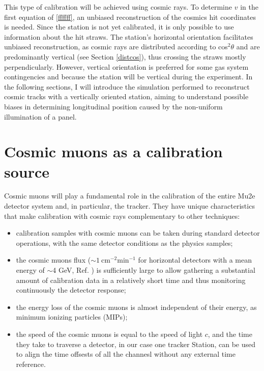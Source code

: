This type of calibration will be achieved using cosmic rays. 
To determine $v$ in the first equation of \ref{ffffff}, 
an unbiased reconstruction of the cosmics hit coordinates is needed.
Since the station is not yet calibrated, it is only possible 
to use information about the hit straws. 
The station's horizontal orientation facilitates unbiased 
reconstruction, as cosmic rays are distributed according to 
cos$^2\theta$ and are predominantly vertical (see Section \ref{distcos}), thus crossing the straws mostly perpendicularly.
However, vertical orientation is preferred for some gas system contingencies and because the station will 
be vertical during the experiment. 
In the following sections, I will introduce the simulation performed to reconstruct cosmic tracks with 
a vertically oriented station, aiming to understand possible biases in determining longitudinal position caused by the non-uniform illumination of a panel.
\section{Cosmic muons as a calibration source}
Cosmic muons will play a fundamental role in the 
calibration of the entire Mu2e detector system and, 
in particular, the tracker. They have unique 
characteristics that make calibration with cosmic rays 
complementary to other techniques:

 

\begin{itemize}
    \item calibration samples with cosmic muons 
    can be taken during standard detector operations, 
    with the same detector conditions as the physics samples;
    \item the cosmic muons flux 
    ($\sim 1 \ \text{cm}^{-2} \text{min}^{-1}$ 
    for horizontal detectors with a mean
    energy of $\sim$4 GeV, Ref. \cite{muonflux}) is sufficiently 
    large to allow gathering a substantial amount of 
    calibration data in a relatively short time and 
    thus monitoring continuously the detector response;
    \item the energy loss of the cosmic muons is almost 
    independent of their energy, as minimum ionizing particles (MIPs);
    \item the speed of the cosmic muons is equal to the 
    speed of light $c$, and the time they take to traverse 
    a detector, in our case one tracker Station, can be 
    used to align the time offsests of all the channesl 
    without any external time reference.
\end{itemize}
